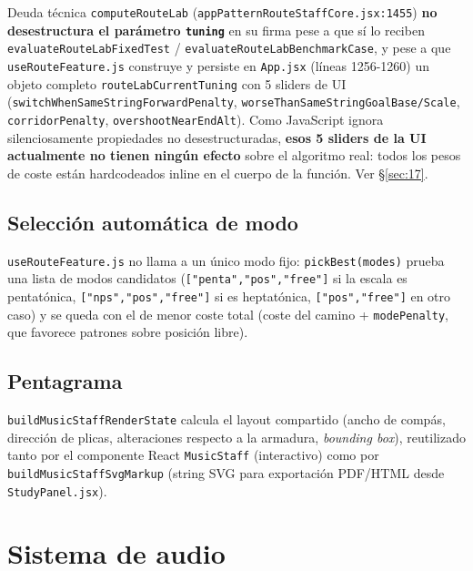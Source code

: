 \documentclass[a4paper,11pt,oneside]{report}
\newcommand{\Sref}[1]{\S\ref{#1}}
\begin{document}
\begin{hallazgobox}{Deuda técnica}
\lstinline!computeRouteLab! (\lstinline!appPatternRouteStaffCore.jsx:1455!) \textbf{no desestructura el parámetro \lstinline!tuning!} en su firma pese a que sí lo reciben \lstinline!evaluateRouteLabFixedTest! / \lstinline!evaluateRouteLabBenchmarkCase!, y pese a que \lstinline!useRouteFeature.js! construye y persiste en \lstinline!App.jsx! (líneas 1256-1260) un objeto completo \lstinline!routeLabCurrentTuning! con 5 sliders de UI (\lstinline!switchWhenSameStringForwardPenalty!, \lstinline!worseThanSameStringGoalBase/Scale!, \lstinline!corridorPenalty!, \lstinline!overshootNearEndAlt!). Como JavaScript ignora silenciosamente propiedades no desestructuradas, \textbf{esos 5 sliders de la UI actualmente no tienen ningún efecto} sobre el algoritmo real: todos los pesos de coste están hardcodeados inline en el cuerpo de la función. Ver \Sref{sec:17}.
\end{hallazgobox}

\section{Selección automática de modo}
\label{sec:10.3}

\lstinline!useRouteFeature.js! no llama a un único modo fijo: \lstinline!pickBest(modes)! prueba una lista de modos candidatos (\lstinline!["penta","pos","free"]! si la escala es pentatónica, \lstinline!["nps","pos","free"]! si es heptatónica, \lstinline!["pos","free"]! en otro caso) y se queda con el de menor coste total (coste del camino + \lstinline!modePenalty!, que favorece patrones sobre posición libre).

\section{Pentagrama}
\label{sec:10.4}

\lstinline!buildMusicStaffRenderState! calcula el layout compartido (ancho de compás, dirección de plicas, alteraciones respecto a la armadura, \textit{bounding box}), reutilizado tanto por el componente React \lstinline!MusicStaff! (interactivo) como por \lstinline!buildMusicStaffSvgMarkup! (string SVG para exportación PDF/HTML desde \lstinline!StudyPanel.jsx!).

\chapter{Sistema de audio}
\label{sec:11}
\end{document}
